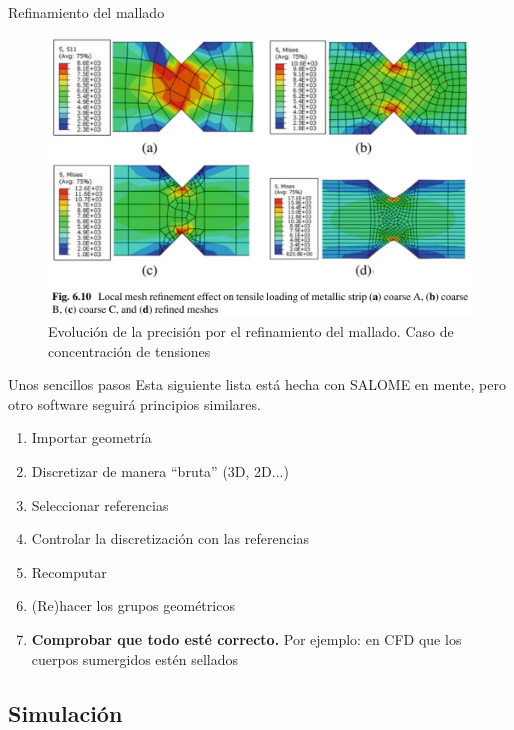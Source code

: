 \documentclass[12pt]{beamer}
\begin{document}
\begin{frame}{Refinamiento del mallado}
	\begin{figure}
		\centering
		\includegraphics[width=0.9\linewidth]{mesh_refinement_steps}
		\caption{Evolución de la precisión por el refinamiento del mallado. Caso de concentración de tensiones}
		\label{fig:meshrefinementsteps}
	\end{figure}
	
\end{frame}

\begin{frame}{Unos sencillos pasos}
	Esta siguiente lista está hecha con SALOME en mente, pero otro software seguirá principios similares.
	\begin{enumerate}
		\item Importar geometría
		\item Discretizar de manera ``bruta'' (3D, 2D...)
		\item Seleccionar referencias
		\item Controlar la discretización con las referencias
		\item Recomputar
		\item (Re)hacer los grupos geométricos
		\item \textbf{Comprobar que todo esté correcto.} Por ejemplo: en CFD que los cuerpos sumergidos estén sellados
	\end{enumerate}
\end{frame}

\subsection{Simulación}
\end{document}
